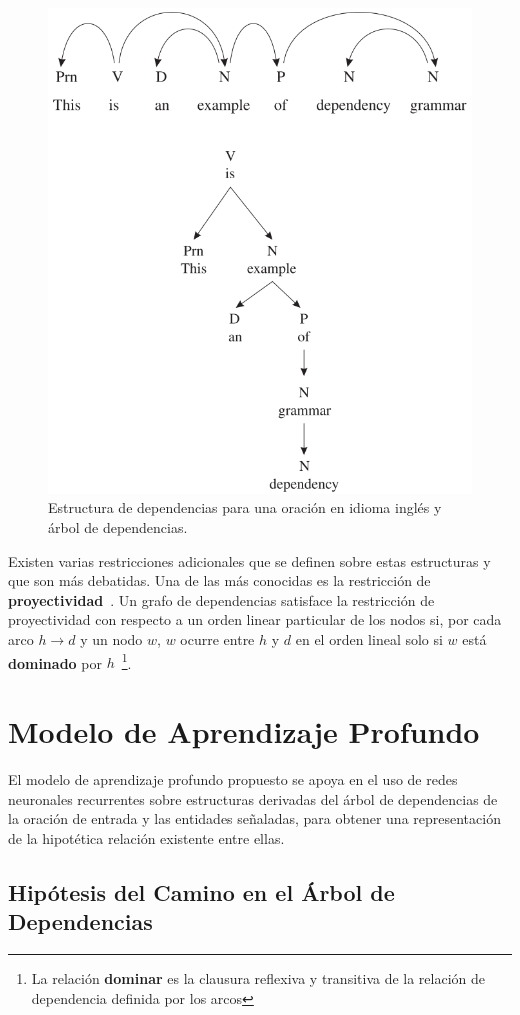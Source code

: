 \begin{figure}[h!]
	\centering
	\includegraphics[width=0.7\linewidth]{Graphics/dep_tree.png}
	\caption{Estructura de dependencias para una oración en idioma inglés y árbol de dependencias.}\label{fig:dep_tree}
\end{figure}

Existen varias restricciones adicionales que se definen sobre estas estructuras y que son más debatidas.
Una de las más conocidas es la restricción de \textbf{proyectividad}~\cite{hays1964dependency,lecerf1960programme,marcus1965notion}.
Un grafo de dependencias satisface la restricción de proyectividad con respecto a un orden linear particular de los nodos si, por cada arco $h \rightarrow d$ y un nodo $w$, $w$ ocurre entre $h$ y $d$ en el orden lineal solo si $w$ está \textbf{dominado} por $h$~\footnote{La relación \textbf{dominar} es la clausura reflexiva y transitiva de la relación de dependencia definida por los arcos}. 

\section{Modelo de Aprendizaje Profundo}\label{sec:model}

El modelo de aprendizaje profundo propuesto se apoya en el uso de redes neuronales recurrentes sobre estructuras derivadas del árbol de dependencias de la oración de entrada y las entidades señaladas, para obtener una representación de la hipotética relación existente entre ellas.

\subsection{Hipótesis del Camino en el Árbol de Dependencias}\label{subsec:dep_tree_hip}

